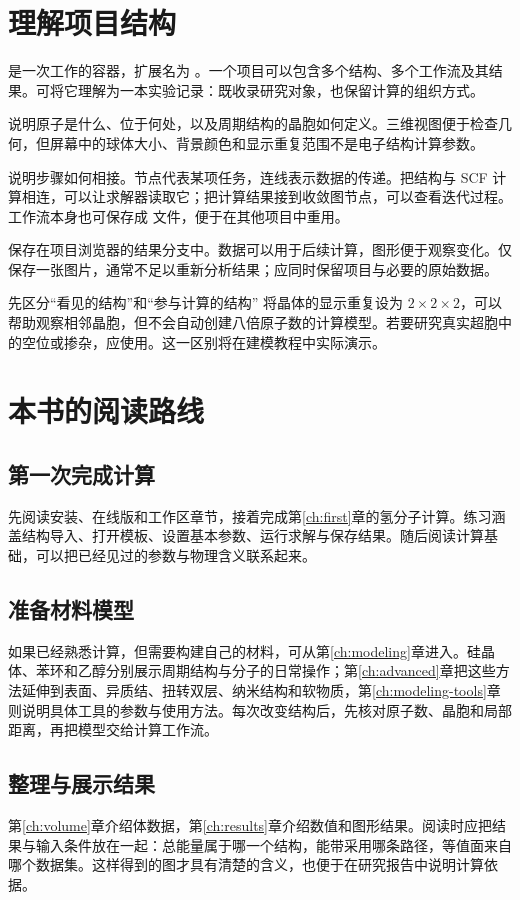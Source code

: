 \section{理解项目结构}
是一次工作的容器，扩展名为 。一个项目可以包含多个结构、多个工作流及其结果。可将它理解为一本实验记录：既收录研究对象，也保留计算的组织方式。

说明原子是什么、位于何处，以及周期结构的晶胞如何定义。三维视图便于检查几何，但屏幕中的球体大小、背景颜色和显示重复范围不是电子结构计算参数。

说明步骤如何相接。节点代表某项任务，连线表示数据的传递。把结构与 SCF 计算相连，可以让求解器读取它；把计算结果接到收敛图节点，可以查看迭代过程。工作流本身也可保存成  文件，便于在其他项目中重用。

保存在项目浏览器的结果分支中。数据可以用于后续计算，图形便于观察变化。仅保存一张图片，通常不足以重新分析结果；应同时保留项目与必要的原始数据。

\begin{notebox}{先区分“看见的结构”和“参与计算的结构”}
将晶体的显示重复设为 $2\times2\times2$，可以帮助观察相邻晶胞，但不会自动创建八倍原子数的计算模型。若要研究真实超胞中的空位或掺杂，应使用。这一区别将在建模教程中实际演示。
\end{notebox}

\section{本书的阅读路线}
\subsection{第一次完成计算}
先阅读安装、在线版和工作区章节，接着完成第\ref{ch:first}章的氢分子计算。练习涵盖结构导入、打开模板、设置基本参数、运行求解与保存结果。随后阅读计算基础，可以把已经见过的参数与物理含义联系起来。

\subsection{准备材料模型}
如果已经熟悉计算，但需要构建自己的材料，可从第\ref{ch:modeling}章进入。硅晶体、苯环和乙醇分别展示周期结构与分子的日常操作；第\ref{ch:advanced}章把这些方法延伸到表面、异质结、扭转双层、纳米结构和软物质，第\ref{ch:modeling-tools}章则说明具体工具的参数与使用方法。每次改变结构后，先核对原子数、晶胞和局部距离，再把模型交给计算工作流。

\subsection{整理与展示结果}
第\ref{ch:volume}章介绍体数据，第\ref{ch:results}章介绍数值和图形结果。阅读时应把结果与输入条件放在一起：总能量属于哪一个结构，能带采用哪条路径，等值面来自哪个数据集。这样得到的图才具有清楚的含义，也便于在研究报告中说明计算依据。

